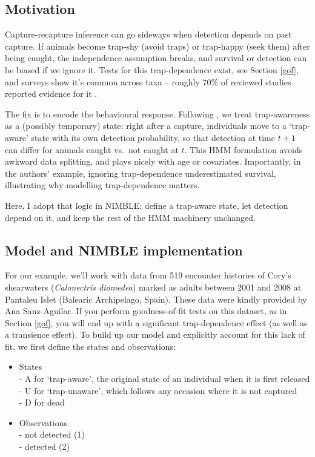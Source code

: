 \documentclass[
  12pt,
]{krantz}
\begin{document}
\subsection{Motivation}\label{motivation-3}

Capture-recapture inference can go sideways when detection depends on past capture. If animals become trap‐shy (avoid traps) or trap‐happy (seek them) after being caught, the independence assumption breaks, and survival or detection can be biased if we ignore it. Tests for this trap‐dependence exist, see Section \ref{gof}, and surveys show it's common across taxa -- roughly 70\% of reviewed studies reported evidence for it \citep{pradeltrapdep2012}.

The fix is to encode the behavioural response. Following \citet{pradeltrapdep2012}, we treat trap‐awareness as a (possibly temporary) state: right after a capture, individuals move to a `trap‐aware' state with its own detection probability, so that detection at time \(t+1\) can differ for animals caught vs.~not caught at \(t\). This HMM formulation avoids awkward data splitting, and plays nicely with age or covariates. Importantly, in the authors' example, ignoring trap‐dependence underestimated survival, illustrating why modelling trap-dependence matters.

Here, I adopt that logic in NIMBLE: define a trap‐aware state, let detection depend on it, and keep the rest of the HMM machinery unchanged.

\subsection{Model and NIMBLE implementation}\label{model-and-nimble-implementation-3}

For our example, we'll work with data from 519 encounter histories of Cory's shearwaters (\emph{Calonectris diomedea}) marked as adults between 2001 and 2008 at Pantaleu Islet (Balearic Archipelago, Spain). These data were kindly provided by Ana Sanz-Aguilar. If you perform goodness-of-fit tests on this dataset, as in Section \ref{gof}, you will end up with a significant trap-dependence effect (as well as a transience effect). To build up our model and explicitly account for this lack of fit, we first define the states and observations:

\begin{itemize}
\item
  States\\
  - A for `trap-aware', the original state of an individual when it is first released\\
  - U for `trap-unaware', which follows any occasion where it is not captured\\
  - D for dead
\item
  Observations\\
  - not detected (1)\\
  - detected (2)
\end{itemize}
\end{document}
